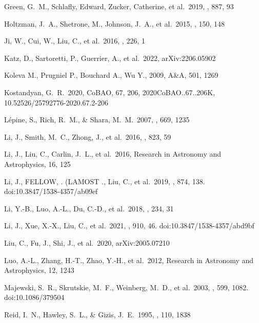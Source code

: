 \documentclass[manuscript]{aastex62}
\begin{document}
\begin{CJK*}{UTF8}{gbsn}
\begin{thebibliography}{}
 Green, G.~M., Schlafly, Edward, Zucker, Catherine, et al.\ 2019, \apj, 887, 93

 Holtzman, J.~A., Shetrone, M., Johnson, J.~A., et al.\ 2015, \aj, 150, 148 

 Ji, W., Cui, W., Liu, C., et al.\ 2016, \apjs, 226, 1 


 Katz, D., Sartoretti, P., Guerrier, A., et al.\ 2022, arXiv:2206.05902


 Koleva M., Prugniel P., Bouchard A., Wu Y., 2009, A\&A, 501, 1269

 Kostandyan, G.~R.\ 2020, CoBAO, 67, 206, 2020CoBAO..67..206K, 10.52526/25792776-2020.67.2-206


 L{\'e}pine, S., Rich, R.~M., \& Shara, M.~M.\ 2007, \apj, 669, 1235

 Li, J., Smith, M.~C., Zhong, J., et al.\ 2016, \apj, 823, 59 

 Li, J., Liu, C., Carlin, J.~L., et al.\ 2016, Research in Astronomy and Astrophysics, 16, 125 

 Li, J., FELLOW, . (LAMOST ., Liu, C., et al.\ 2019, \apj, 874, 138. doi:10.3847/1538-4357/ab09ef

 Li, Y.-B., Luo, A.-L., Du, C.-D., et al.\ 2018, \apjs, 234, 31 

 Li, J., Xue, X.-X., Liu, C., et al.\ 2021, \apj, 910, 46. doi:10.3847/1538-4357/abd9bf

 Liu, C., Fu, J., Shi, J., et al.\ 2020, arXiv:2005.07210

 Luo, A.-L., Zhang, H.-T., Zhao, Y.-H., et al.\ 2012, Research in Astronomy and Astrophysics, 12, 1243 

 Majewski, S.~R., Skrutskie, M.~F., Weinberg, M.~D., et al.\ 2003, \apj, 599, 1082. doi:10.1086/379504

 Reid, I.~N., Hawley, S.~L., \& Gizis, J.~E.\ 1995, \aj, 110, 1838


\end{thebibliography}
\end{CJK*}
\end{document}
